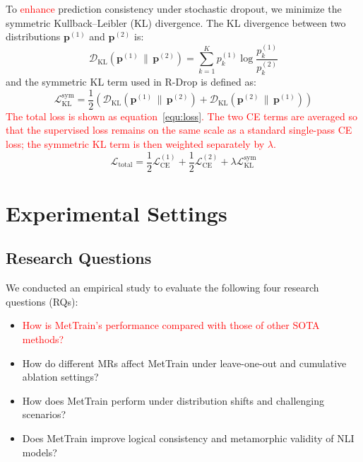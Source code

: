\documentclass[lettersize,journal]{IEEEtran}
\newcommand{\red}[1]{\textcolor{red}{#1}}
\begin{document}
To \red{enhance} prediction consistency under stochastic dropout, we minimize the symmetric Kullback--Leibler (KL) divergence. The KL divergence between two distributions $\mathbf{p}^{(1)}$ and $\mathbf{p}^{(2)}$ is:
\begin{equation}
	\label{equ:KL_def}
	\mathcal{D}_{\mathrm{KL}}(\mathbf{p}^{(1)}\,\|\,\mathbf{p}^{(2)})=\sum_{k=1}^{K} p^{(1)}_{k}\log\frac{p^{(1)}_{k}}{p^{(2)}_{k}}
\end{equation}
and the symmetric KL term used in R-Drop is defined as:
\begin{equation}
	\label{equ:KL}
	\mathcal{L}_{\mathrm{KL}}^{\mathrm{sym}}
	= \frac{1}{2} \left( \mathcal{D}_{\mathrm{KL}}(\mathbf{p}^{(1)} \,\|\, \mathbf{p}^{(2)})
	+ \mathcal{D}_{\mathrm{KL}}(\mathbf{p}^{(2)} \,\|\, \mathbf{p}^{(1)}) \right)
\end{equation}
\red{The total loss is shown as equation~\ref{equ:loss}. The two CE terms are averaged so that the supervised loss remains on the same scale as a standard single-pass CE loss; the symmetric KL term is then weighted separately by $\lambda$.}
\begin{equation}
	\label{equ:loss}
	\mathcal{L}_{\mathrm{total}}
	= \frac{1}{2}\mathcal{L}_{\mathrm{CE}}^{(1)} + \frac{1}{2}\mathcal{L}_{\mathrm{CE}}^{(2)} + \lambda \mathcal{L}_{\mathrm{KL}}^{\mathrm{sym}}
\end{equation}

\section{Experimental Settings}

\subsection{Research Questions}
We conducted an empirical study to evaluate the following four research questions (RQs):
\begin{itemize}
	\item \red{How is MetTrain's performance compared with those of other SOTA methods?}
	\item How do different MRs affect MetTrain under leave-one-out and cumulative ablation settings?
	\item How does MetTrain perform under distribution shifts and challenging scenarios?
	\item Does MetTrain improve logical consistency and metamorphic validity of NLI models?
\end{itemize}
\end{document}
